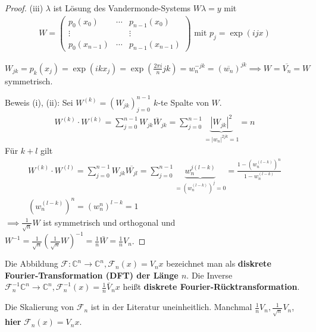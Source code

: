 \begin{proof}
	(iii) $\lambda$ ist Lösung des Vandermonde-Systems $W\lambda = y$ mit
	\begin{align*}
		W = \left(\begin{matrix}
			p_0(x_0) & \cdots & p_{n-1}(x_0)\\
			\vdots & & \vdots\\
			p_0(x_{n-1}) & \cdots & p_{n-1}(x_{n-1})
		\end{matrix}\right) \text{ mit } p_j = \exp(ijx)
	\end{align*}
	
	$W_{jk} = p_k(x_j) = \exp(ikx_j) = \exp\left(\frac{2\pi i}{n} jk\right) = w_n^{-jk} = (\overline{w_n})^{jk} \implies W = \overline{V_n} = W$ symmetrisch.
	
	Beweis (i), (ii): Sei $W^{(k)} = (W_{jk})_{j=0}^{n-1}$ $k$-te Spalte von $W$.
	\begin{align*}
		W^{(k)} \cdot W^{(k)} = \sum_{j=0}^{n-1} W_{jk} \overline{W}_{jk} = \sum_{j=0}^{n-1} \underbrace{|W_{jk}|^2}_{=|w_n|^{2jk}=1} = n
	\end{align*}
	Für $k+l$ gilt
	\begin{align*}
		W^{(k)} \cdot W^{(l)} = \sum_{j=0}^{n-1} W_{jk} \overline{W_{jl}} = \sum_{j=0}^{n-1} \underbrace{w_n^{j(l-k)}}_{=(w_n^{(l-k)})^j=0} = \frac{1-(w_n^{(l-k)})^n}{1-w_n^{(l-k)}}\\
		(w_n^{(l-k)})^n = (w_n^n)^{l-k} = 1
	\end{align*}
	$\implies \frac{1}{\sqrt{n}}W$ ist symmetrisch und orthogonal und $W^{-1} = \frac{1}{\sqrt{n}} \left(\frac{1}{\sqrt{n}}W\right)^{-1} = \frac{1}{n} \bar{W} = \frac{1}{n} V_n$.
\end{proof}

\begin{definition}
	Die Abbildung $\mathcal{F}:\mathbb{C}^n \rightarrow \mathbb{C}^n, \mathcal{F}_n(x) = V_n x$ bezeichnet man als \textbf{diskrete Fourier-Transformation (DFT) der Länge $n$}. Die Inverse $\mathcal{F}_n^{-1} \mathbb{C}^n \rightarrow \mathbb{C}^n, \mathcal{F}_n^{-1}(x) = \frac{1}{n}\bar{V}_nx$ heißt \textbf{diskrete Fourier-Rücktransformation}.
\end{definition}

\begin{remark}
	Die Skalierung von $\mathcal{F}_n$ ist in der Literatur uneinheitlich. Manchmal $\frac{1}{n}V_n, \frac{1}{\sqrt{n}}V_n$, \textbf{hier} $\mathcal{F}_n(x) = V_n x$.
\end{remark}

